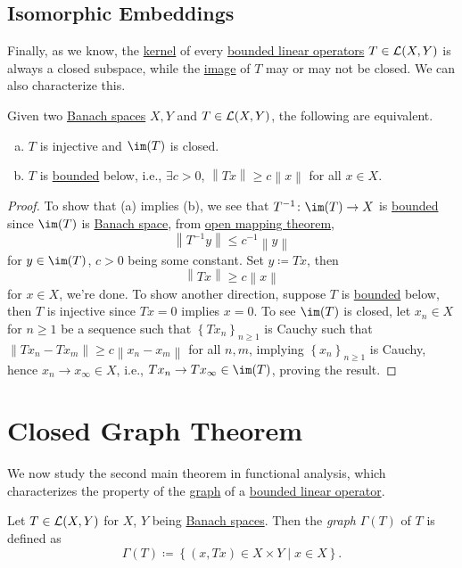 \subsection{Isomorphic Embeddings}
Finally, as we know, the \hyperref[def:kernel]{kernel} of every \hyperref[def:bounded-linear-op]{bounded linear operators} \(T\in \mathcal{\MakeUppercase{l}} (X, Y)\) is always a closed subspace, while the \hyperref[def:image]{image} of \(T\) may or may not be closed. We can also characterize this.

\begin{proposition}\label{prop:isomorphic-embedding}
	Given two \hyperref[def:Banach-space]{Banach spaces} \(X, Y\) and \(T\in \mathcal{\MakeUppercase{l}} (X, Y)\), the following are equivalent.
	\begin{enumerate}[(a)]
		\item \(T\) is injective and \(\im (T)\) is closed.
		\item \(T\) is \hyperref[rmk:bounded-op]{bounded} below, i.e., \(\exists c > 0\), \(\left\lVert Tx\right\rVert \geq c \left\lVert x\right\rVert \) for all \(x\in X\).
	\end{enumerate}
\end{proposition}
\begin{proof}
	To show that (a) implies (b), we see that \(T^{-1} \colon \im(T) \to X\) is \hyperref[rmk:bounded-op]{bounded}  since \(\im(T)\) is \hyperref[def:Banach-space]{Banach space}, from \hyperref[thm:open-mapping]{open mapping theorem},
	\[
		\left\lVert T^{-1} y\right\rVert \leq c^{-1} \left\lVert y\right\rVert
	\]
	for \(y\in \im(T)\), \(c > 0\) being some constant. Set \(y\coloneqq Tx\), then
	\[
		\left\lVert Tx\right\rVert \geq c\left\lVert x\right\rVert
	\]
	for \(x\in X\), we're done. To show another direction, suppose \(T\) is \hyperref[rmk:bounded-op]{bounded} below, then \(T\) is injective since \(Tx= 0\) implies \(x = 0\). To see \(\im(T)\) is closed, let \(x_{n} \in X\) for \(n\geq 1\) be a sequence such that \(\left\{ Tx_n \right\} _{n \geq 1}\) is Cauchy such that \(\left\lVert Tx_n - Tx_m\right\rVert \geq c \left\lVert x_n - x_m\right\rVert \) for all \(n, m\), implying \(\left\{ x_n \right\} _{n\geq 1}\)  is Cauchy, hence \(x_n \to x_\infty \in X\), i.e., \(Tx_n \to Tx_\infty \in \im(T)\), proving the result.
\end{proof}

\section{Closed Graph Theorem}
We now study the second main theorem in functional analysis, which characterizes the property of the \hyperref[def:graph]{graph} of a \hyperref[def:bounded-linear-op]{bounded linear operator}.
\begin{definition}[Graph]\label{def:graph}
	Let \(T\in \mathcal{\MakeUppercase{l}} (X, Y)\) for \(X\), \(Y\) being \hyperref[def:Banach-space]{Banach spaces}. Then the \emph{graph} \(\Gamma (T)\) of \(T\) is defined as
	\[
		\Gamma (T) \coloneqq \left\{ (x, Tx) \in X \times Y\mid x\in X \right\}.
	\]
\end{definition}

